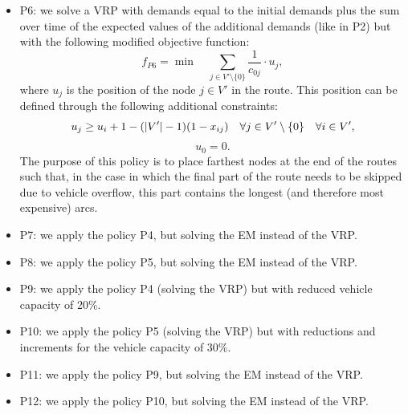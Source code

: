 \documentclass[authoryear,preprint,12pt]{elsarticle}
\begin{document}
\begin{itemize}
\item P6:  we solve a VRP with demands equal to the initial demands plus the sum over time of the expected values of the additional demands (like in P2) but with the following modified objective function:
$$
 f_{P6} =  \min \quad  \sum_{j \in V'\setminus\{0\}} \frac{1}{c_{0j}} \cdot u_{j},   
$$
where $u_{j}$ is the position of the node $j \in V'$ in the route. This position can be defined through the following additional constraints:
$$
u_{j}  \geq u_{i} +1 - (|V'|-1) (1-x_{ij})  \quad \forall j \in V'\setminus\{0\} \quad \forall i \in V',\vspace{-0.3cm}
$$
%
$$
u_{0}=0.  
$$
The purpose of this policy is to place farthest nodes at the end of the routes such that, in the case in which the final part of the route needs to be skipped due to vehicle overflow, this part contains the longest (and therefore most expensive) arcs.


\item P7: we apply the policy P4, but solving the EM instead of the VRP. 

\item P8: we apply the policy P5, but solving the EM instead of the VRP. 

\item P9: we apply the policy P4 (solving the VRP) but with reduced vehicle capacity of 20\%.

\item P10: we apply the policy P5 (solving the VRP) but with reductions and increments for the vehicle capacity of 30\%.

\item P11: we apply the policy P9, but solving the EM instead of the VRP.

\item P12: we apply the policy P10, but solving the EM instead of the VRP.
\end{itemize}


\end{document}
